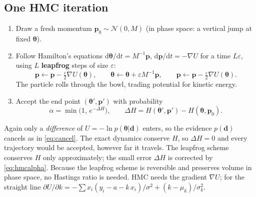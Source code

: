 \documentclass[11pt,a4paper]{article}
\newcommand{\dd}{\mathrm{d}}
\newcommand{\vth}{\boldsymbol{\theta}}
\newcommand{\vp}{\mathbf{p}}
\newcommand{\vd}{\mathbf{d}}
\begin{document}
\subsection{One HMC iteration}
\begin{enumerate}
\item Draw a fresh momentum $\vp_0\sim\mathcal{N}(0,M)$ (in phase space: a vertical jump at fixed $\vth$).
\item Follow Hamilton's equations $\dd\vth/\dd t=M^{-1}\vp$, $\dd\vp/\dd t=-\nabla U$ for a time $L\varepsilon$,
  using $L$ \textbf{leapfrog} steps of size $\varepsilon$:
  \begin{equation}
    \vp \leftarrow \vp-\tfrac{\varepsilon}{2}\nabla U(\vth),\qquad
    \vth \leftarrow \vth+\varepsilon M^{-1}\vp,\qquad
    \vp \leftarrow \vp-\tfrac{\varepsilon}{2}\nabla U(\vth).
  \end{equation}
  The particle rolls through the bowl, trading potential for kinetic energy.
\item Accept the end point $(\vth',\vp')$ with probability
  \begin{equation}
    \alpha = \min\bigl(1,\,e^{-\Delta H}\bigr),\qquad \Delta H = H(\vth',\vp')-H(\vth,\vp_0).
    \label{eq:hmcalpha}
  \end{equation}
\end{enumerate}
\begin{keypoint}
Again only a \emph{difference} of $U=-\ln p(\vth|\vd)$ enters, so the evidence $p(\vd)$ cancels as in
\eqref{eq:cancel}. The exact dynamics conserve $H$, so $\Delta H=0$ and every trajectory would be accepted,
however far it travels. The leapfrog scheme conserves $H$ only approximately; the small error $\Delta H$ is
corrected by \eqref{eq:hmcalpha}. Because the leapfrog scheme is reversible and preserves volume in phase space,
no Hastings ratio is needed. HMC needs the gradient $\nabla U$; for the straight line
$\partial U/\partial k = -\sum x_i(y_i-a-k\,x_i)/\sigma^2 + (k-\mu_k)/\sigma_k^2$.
\end{keypoint}
\end{document}
